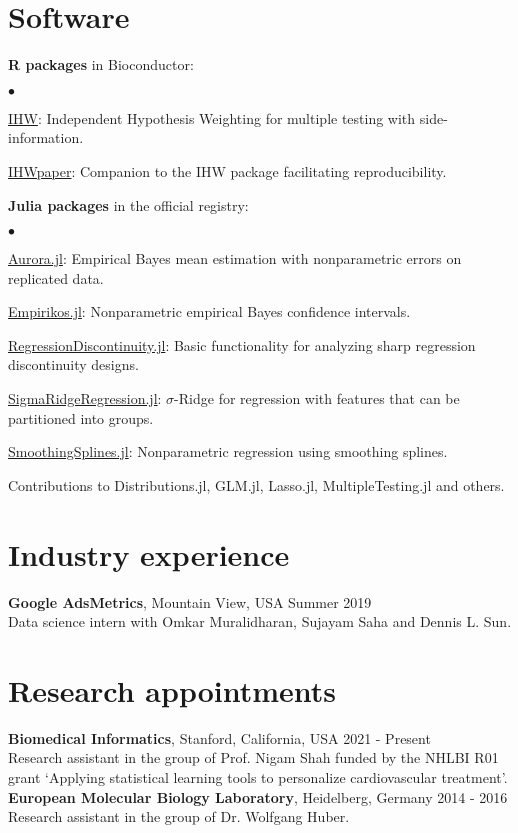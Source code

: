 \documentclass[margin,line]{res}
\newenvironment{list2}{
  \begin{list}{$\bullet$}{%
      \setlength{\itemsep}{0in}
      \setlength{\parsep}{0in} \setlength{\parskip}{0in}
      \setlength{\topsep}{0in} \setlength{\partopsep}{0in}
      \setlength{\leftmargin}{0.2in}}}{\end{list}}
\begin{document}
\begin{resume}
\section{\sc Software}
{\bf R packages} in Bioconductor:
\begin{list2}
\item \href{https://bioconductor.org/packages/IHW}{{\color{urlblue} IHW}}:  Independent Hypothesis Weighting for multiple testing with side-information.
\item \href{https://bioconductor.org/packages/IHWpaper}{{\color{urlblue} IHWpaper}}: Companion to the IHW package facilitating reproducibility.
\end{list2}
{\bf Julia packages} in the official registry:
\begin{list2}
\item \href{https://github.com/nignatiadis/Aurora.jl}{{\color{urlblue} Aurora.jl}}: Empirical Bayes mean estimation with nonparametric errors on replicated data.
\item \href{https://github.com/nignatiadis/Empirikos.jl}{{\color{urlblue} Empirikos.jl}}: Nonparametric empirical Bayes confidence intervals.
\item \href{https://github.com/nignatiadis/RegressionDiscontinuity.jl}{{\color{urlblue}  RegressionDiscontinuity.jl}}: Basic functionality for analyzing sharp regression discontinuity designs. 
\item \href{https://github.com/nignatiadis/SigmaRidgeRegression.jl}{{\color{urlblue} SigmaRidgeRegression.jl}}: $\sigma$-Ridge for regression with features that can be partitioned into groups.
\item \href{https://github.com/nignatiadis/SmoothingSplines.jl}{{\color{urlblue} SmoothingSplines.jl}}: Nonparametric regression using smoothing splines.
\item Contributions to Distributions.jl, GLM.jl, Lasso.jl, MultipleTesting.jl and others.
\end{list2}


\section{\sc Industry experience}
\textbf{Google AdsMetrics}, Mountain View, USA \hfill Summer 2019\\
Data science intern with Omkar Muralidharan, Sujayam Saha and Dennis L. Sun. 


\section{\sc Research appointments}
{\bf Biomedical Informatics},  Stanford, California, USA \hfill 2021 - Present\\
Research assistant in the group of Prof. Nigam Shah funded by the NHLBI R01 grant `Applying statistical learning tools to personalize cardiovascular treatment'.\\
{\bf European Molecular Biology Laboratory},  Heidelberg, Germany \hfill 2014 - 2016\\
Research assistant in the group of Dr. Wolfgang Huber.


\end{resume}
\end{document}
